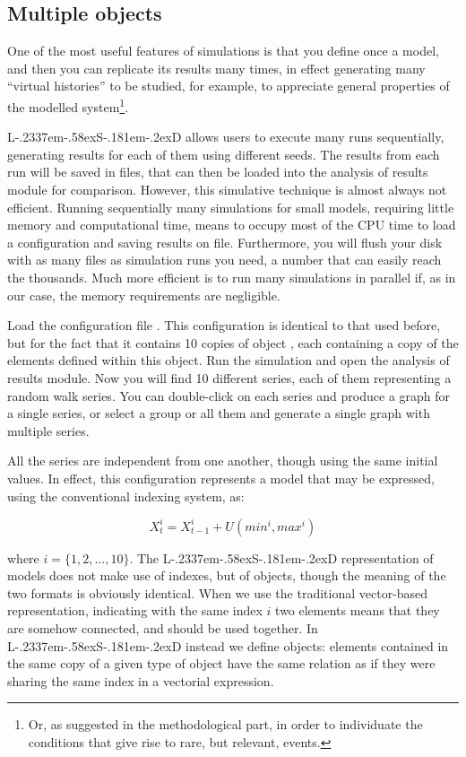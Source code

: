 \documentclass [11pt,a4paper] {book}
\def\LsD{{L\kern-.2337em\lower-.58ex\hbox{S}\kern-.181em\lower-.2ex\hbox{D}}\xspace}
\begin{document}
\subsection{Multiple objects}

One of the most useful features of simulations is that you define once a model, and then you can replicate its results many times, in effect generating many ``virtual histories'' to be studied, for example, to appreciate general properties of the modelled system\footnote{Or, as suggested in the methodological part, in order to individuate the conditions that give rise to rare, but relevant, events.}.

\LsD allows users to execute many runs sequentially, generating results for each of them using different seeds. The results from each run will be saved in files, that can then be loaded into the analysis of results module for comparison. However, this simulative technique is almost always not efficient. Running sequentially many simulations for small models, requiring little memory and computational time, means to occupy most of the CPU time to load a configuration and saving results on file. Furthermore, you will flush your disk with as many files as simulation runs you need, a number that can easily reach the thousands. Much more efficient is to run many simulations in parallel if, as in our case, the memory requirements are negligible.

Load the configuration file . This configuration is identical to that used before, but for the fact that it contains 10 copies of object , each containing a copy of the elements defined within this object. Run the simulation and open the analysis of results module. Now you will find 10 different series, each of them representing a random walk series. You can double-click on each series and produce a graph for a single series, or select a group or all them and generate a single graph with multiple series.


All the series are independent from one another, though using the same initial values. In effect, this configuration represents a model that may be expressed, using the conventional indexing system, as:

\[
X^i_t=X^i_{t-1} + U(min^i, max^i)
\]

where $i=\{1, 2, ..., 10\}$. The \LsD representation of models does not make use of indexes, but of objects, though the meaning of the two formats is obviously identical. When we use the traditional vector-based representation, indicating with the same index $i$ two elements means that they are somehow connected, and should be used together. In \LsD instead we define objects: elements contained in the same copy of a given type of object have the same relation as if they were sharing the same index in a vectorial expression.
\end{document}
